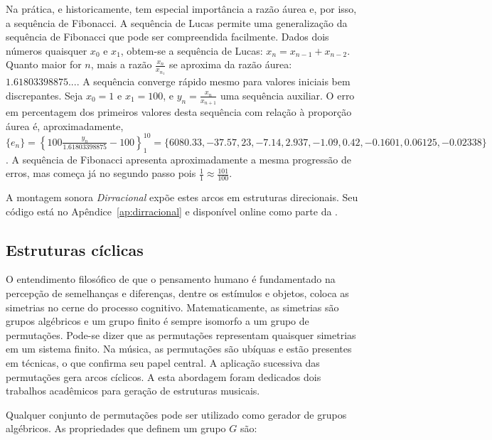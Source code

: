 Na prática, e historicamente, tem especial importância a razão áurea e, por isso, a sequência de Fibonacci. A sequência de Lucas permite uma generalização da sequência de Fibonacci que pode ser compreendida facilmente. Dados dois números quaisquer $x_0$ e $x_1$, obtem-se a sequência de Lucas: $x_n=x_{n-1}+x_{n-2}$. Quanto maior for $n$, mais a razão $\frac{x_{n}}{x_{n_1}}$ se aproxima da razão áurea: $1.61803398875...$. A sequência converge rápido mesmo para valores iniciais bem discrepantes. Seja $x_0=1$ e $x_1=100$, e $y_n=\frac{x_n}{x_{n+1}}$ uma sequência auxiliar. O erro em percentagem dos primeiros valores desta sequência com relação à proporção áurea é, aproximadamente, $\{ e_n \} =\left\{100\frac{y_n}{1.61803398875}-100 \right\}_1^{10}=\{6080.33, -37.57, 23, -7.14, 2.937, -1.09, 0.42, -0.1601, 0.06125, -0.02338\}$. A sequência de Fibonacci apresenta aproximadamente a mesma progressão de erros, mas começa já no segundo passo pois $\frac{1}{1}\approx\frac{101}{100}$.

A montagem sonora \emph{Dirracional} expõe estes arcos em estruturas direcionais. Seu código está no Apêndice~\ref{ap:dirracional} e disponível online como parte da \massa.\cite{MASSA}

\subsection{Estruturas cíclicas}\label{estCic}

O entendimento filosófico de que o pensamento humano é fundamentado
na percepção de semelhanças e diferenças, dentre os estímulos
e objetos, coloca
as simetrias no cerne do processo cognitivo.\cite{Deleuze}
Matematicamente,
as simetrias são grupos algébricos e um grupo finito
é sempre isomorfo a um grupo de permutações. 
Pode-se dizer que
as permutações representam quaisquer simetrias em um sistema finito.
Na música, as permutações são ubíquas
e estão presentes em técnicas, o que confirma seu papel central.
A aplicação sucessiva das permutações gera arcos cíclicos.\cite{change,Zamacois,permMusic}
A esta abordagem foram dedicados dois trabalhos acadêmicos para geração de estruturas musicais.\cite{figgusOriginal, figgusEspacializacao}

Qualquer conjunto de permutações pode ser utilizado como gerador de grupos algébricos.\cite{permMusic} As propriedades que definem um grupo $G$ são:

